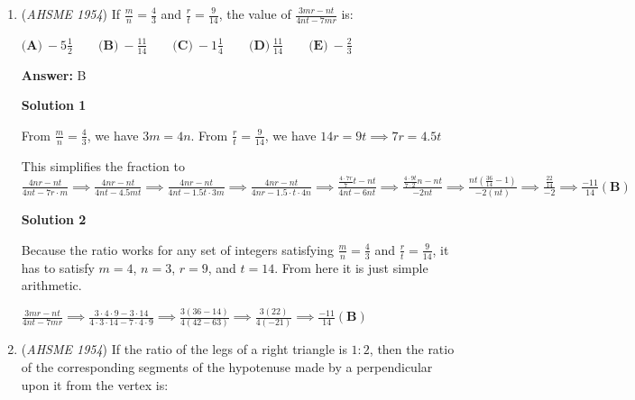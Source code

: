 \begin{enumerate}
 \textbf{Answer: }D



\textbf{Solution}

Because the circle has the same radius as the sphere, the cylinder and sphere have the same radius. Then from the volume of cylinder and volume of a sphere formulas, we have $\frac{1}{3} \pi r^2 h= \frac{2}{3} \pi r^3 \implies h=2r\implies \frac{h}{r}=2$ $\boxed{(\textbf{D})}$



	\item (\textit{AHSME 1954}) If $\frac{m}{n}=\frac{4}{3}$ and $\frac{r}{t}=\frac{9}{14}$, the value of $\frac{3mr-nt}{4nt-7mr}$ is: 


 $\textbf{(A)}\ -5\frac{1}{2}\qquad\textbf{(B)}\ -\frac{11}{14}\qquad\textbf{(C)}\ -1\frac{1}{4}\qquad\textbf{(D)}\ \frac{11}{14}\qquad\textbf{(E)}\ -\frac{2}{3}$

 \textbf{Answer: }B



\textbf{Solution 1}

From $\frac{m}{n}=\frac{4}{3}$, we have $3m=4n$. From $\frac{r}{t}=\frac{9}{14}$, we have $14r=9t\implies 7r=4.5t$ 

 This simplifies the fraction to $\frac{4nr-nt}{4nt-7r\cdot m}\implies \frac{4nr-nt}{4nt-4.5mt}\implies \frac{4nr-nt}{4nt-1.5t\cdot3m}\implies \frac{4nr-nt}{4nr-1.5\cdot t\cdot 4n}\implies \frac{\frac{4\cdot7r}{7}t-nt}{4nt-6nt}\implies \frac{\frac{4\cdot9t}{7\cdot2}n-nt}{-2nt}\implies \frac{nt(\frac{36}{14}-1)}{-2(nt)}\implies\frac{\frac{22}{14}}{-2}\implies \boxed{\frac{-11}{14} (\textbf{B})}$




\textbf{Solution 2}

Because the ratio works for any set of integers satisfying $\frac{m}{n}=\frac{4}{3}$ and $\frac{r}{t}=\frac{9}{14}$, it has to satisfy $m=4$, $n=3$, $r=9$, and $t=14$. From here it is just simple arithmetic.

 $\frac{3mr-nt}{4nt-7mr}\implies\frac{3\cdot4\cdot9-3\cdot14}{4\cdot3\cdot14-7\cdot4\cdot9}\implies \frac{3(36-14)}{4(42-63)}\implies \frac{3(22)}{4(-21)}\implies \boxed{\frac{-11}{14} (\textbf{B})}$



	\item (\textit{AHSME 1954}) If the ratio of the legs of a right triangle is $1: 2$, then the ratio of the corresponding segments of 
the hypotenuse made by a perpendicular upon it from the vertex is: 



\end{enumerate}
